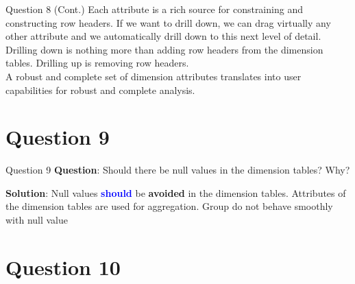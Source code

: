 \begin{frame}[fragile]{Question 8 (Cont.)}
	Each attribute is a rich source for constraining and constructing row headers. If we want to drill down, we can drag virtually any other attribute and we automatically drill down to this next level of detail.\\\vspace{5pt}	
	Drilling down is nothing more than adding row headers from the dimension tables. Drilling up is removing row headers.\\\vspace{5pt}	
	A robust and complete set of dimension attributes translates into user capabilities for robust and complete analysis.
\end{frame}

\section*{Question 9}

\begin{frame}[fragile]{Question 9}
	\textbf{Question}: Should there be null values in the dimension tables? Why? \\\vspace{10pt}
	
	\textbf{Solution}: Null values \textcolor{blue}{\textbf{should}} be \textbf{avoided} in the dimension tables. Attributes of the dimension tables are used for aggregation. Group do not behave smoothly with null value
\end{frame}

\section*{Question 10}

